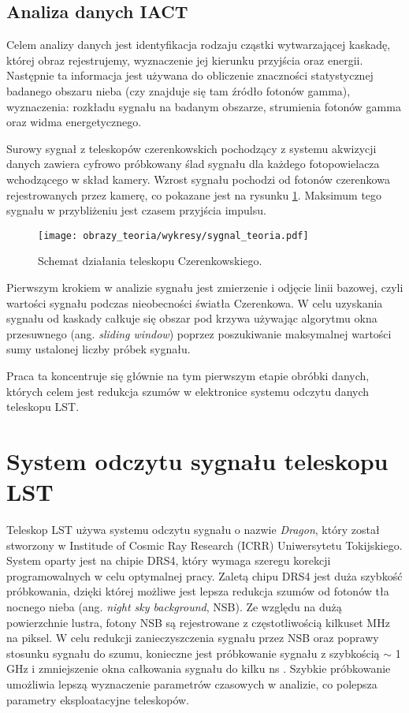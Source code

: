 \documentclass[a4paper,11pt,twoside]{article}
\begin{document}
\subsection{Analiza danych IACT}
Celem analizy danych jest identyfikacja rodzaju cząstki wytwarzającej  kaskadę, której obraz rejestrujemy, wyznaczenie jej kierunku przyjścia oraz energii. Następnie ta informacja jest używana do obliczenie znaczności statystycznej badanego obszaru nieba (czy znajduje się tam źródło fotonów gamma), wyznaczenia: rozkładu sygnału na badanym obszarze, strumienia fotonów gamma oraz widma energetycznego. 

Surowy sygnał z teleskopów czerenkowskich pochodzący z systemu akwizycji danych zawiera cyfrowo próbkowany ślad sygnału dla każdego fotopowielacza wchodzącego w skład kamery. Wzrost sygnału pochodzi od fotonów czerenkowa rejestrowanych przez kamerę, co pokazane jest na rysunku \ref{fig:signal_theory}.
 Maksimum tego sygnału w przybliżeniu jest czasem przyjścia impulsu.
\begin{figure}[H] 
\centering
\texttt{[image: obrazy\_teoria/wykresy/sygnal\_teoria.pdf]}
\caption{Schemat działania teleskopu Czerenkowskiego.}
\label{fig:signal_theory}
\end{figure}

Pierwszym krokiem w analizie sygnału jest zmierzenie i odjęcie linii bazowej, czyli wartości sygnału podczas nieobecności światła Czerenkowa. W celu uzyskania sygnału od kaskady całkuje się obszar pod krzywa używając algorytmu okna przesuwnego (ang. \textsl{sliding window}) poprzez poszukiwanie maksymalnej wartości sumy ustalonej liczby próbek sygnału.

Praca ta koncentruje się głównie na tym pierwszym etapie obróbki danych, których celem jest redukcja szumów w elektronice systemu odczytu danych teleskopu LST. 

\newpage
\section{System odczytu sygnału teleskopu LST}
Teleskop LST używa systemu odczytu sygnału o nazwie \textsl{Dragon}, który został stworzony w Institude of Cosmic Ray Research (ICRR) Uniwersytetu Tokijskiego. System oparty jest na chipie DRS4, który wymaga szeregu korekcji programowalnych w celu optymalnej pracy. Zaletą chipu DRS4 jest duża szybkość próbkowania, dzięki której możliwe jest lepsza redukcja szumów od fotonów tła nocnego nieba (ang. \textsl{night sky background}, NSB).
Ze względu na dużą powierzchnie lustra, fotony NSB są rejestrowane z częstotliwością kilkuset MHz na piksel. W celu redukcji zanieczyszczenia sygnału przez NSB oraz poprawy stosunku sygnału do szumu, konieczne jest próbkowanie  sygnału z szybkością $\sim$ 1 GHz i zmniejszenie okna całkowania sygnału do kilku ns \cite{dragon_lst}. Szybkie próbkowanie umożliwia lepszą wyznaczenie parametrów czasowych w analizie, co polepsza parametry eksploatacyjne teleskopów.
\end{document}
